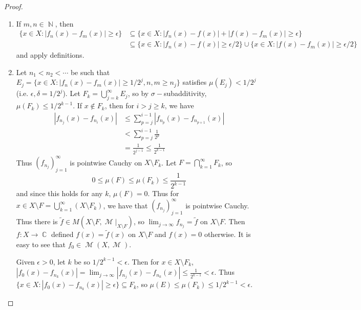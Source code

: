 \documentclass[11pt, a4paper]{memoir}
\DeclareMathOperator{\N}{{\mathbb{N}}}
\DeclareMathOperator{\C}{{\mathbb{C}}}
\theoremstyle{change}
\theoremstyle{plain}
\theoremstyle{nonumberplain}
\newtheorem{proof}{Proof}
\DeclareMathOperator{\M}{{\mathcal{M}}}
\begin{document}
\begin{proof}
    \begin{enumerate}[nolistsep,label=(\roman*)]
        \item If $m,n\in\N$, then
            \begin{align*}
                \{x\in X:|f_n(x)-f_m(x)|\geq\epsilon\}&\subseteq\{x\in X:|f_n(x)-f(x)|+|f(x)-f_m(x)|\geq\epsilon\}\\
                                                      &\subseteq\{x\in X:|f_n(x)-f(x)|\geq\epsilon/2\}\cup\{x\in X:|f(x)-f_m(x)|\geq\epsilon/2\}
            \end{align*}
            and apply definitions.
        \item Let $n_1<n_2<\cdots$ be such that $E_j=\{x\in X:|f_n(x)-f_m(x)|\geq 1/2^j,n,m\geq n_j\}$ satisfies $\mu(E_j)<1/2^j$ (i.e. $\epsilon,\delta=1/2^j$).
            Let $F_k=\bigcup_{j=k}^\infty E_j$, so by $\sigma-$subadditivity, $\mu(F_k)\leq 1/2^{k-1}$.
            If $x\notin F_k$, then for $i>j\geq k$, we have
            \begin{align*}
                |f_{n_j}(x)-f_{n_i}(x)| &\leq\sum\limits_{p=j}^{i-1}|f_{n_p}(x)-f_{n_{p+1}}(x)|\\
                                        &< \sum\limits_{p=j}^{i-1}\frac{1}{2^p}\\
                                        &= \frac{1}{2^{j-1}}\leq\frac{1}{2^{k-1}}
            \end{align*}
            Thus $(f_{n_j})_{j=1}^\infty$ is pointwise Cauchy on $X\setminus F_k$.
            Let $F=\bigcap_{k=1}^\infty F_k$, so
            \begin{equation*}
                0\leq \mu(F)\leq\mu(F_k)\leq\frac{1}{2^{k-1}}
            \end{equation*}
            and since this holds for any $k$, $\mu(F)=0$.
            Thus for $x\in X\setminus F=\bigcup_{k=1}^\infty(X\setminus F_k)$, we have that $(f_{n_j})_{j=1}^\infty$ is pointwise Cauchy.
            Thus there is $\tilde f\in M(X\setminus F,\M|_{X\setminus F})$, so $\lim_{j\to\infty}f_{n_j}=\tilde f$ on $X\setminus F$.
            Then $f:X\to\C$ defined $f(x)=\tilde f(x)$ on $X\setminus F$ and $f(x)=0$ otherwise.
            It is easy to see that $f_0\in \M(X,\M)$.

            Given $\epsilon>0$, let $k$ be so $1/2^{k-1}<\epsilon$.
            Then for $x\in X\setminus F_k$, $|f_0(x)-f_{n_k}(x)|=\lim_{j\to\infty}|f_{n_j}(x)-f_{n_k}(x)|\leq\frac{1}{2^{k-1}}<\epsilon$.
            Thus $\{x\in X:|f_0(x)-f_{n_k}(x)|\geq\epsilon\}\subseteq F_k$, so $\mu(E)\leq\mu(F_k)\leq1/2^{k-1}<\epsilon$.
    \end{enumerate}
\end{proof}
\end{document}
